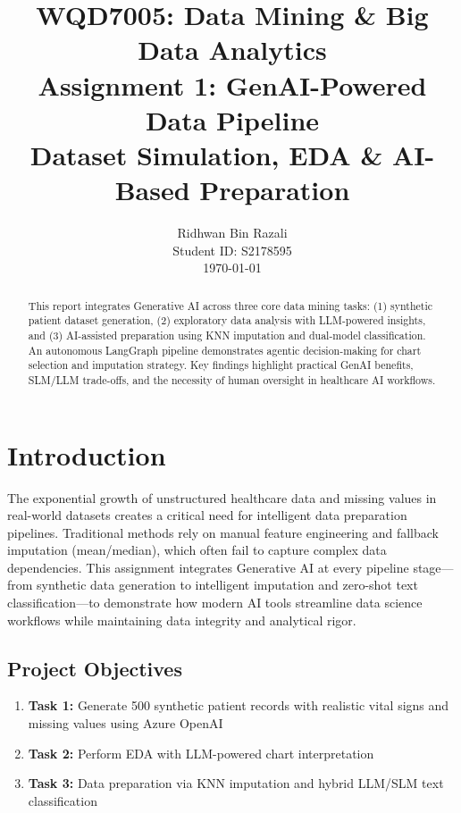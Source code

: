\documentclass[10pt,a4paper]{article}
\title{
    \textbf{WQD7005: Data Mining \& Big Data Analytics}\\
    \vspace{0.5cm}
    \Large Assignment 1: GenAI-Powered Data Pipeline\\
    \normalsize Dataset Simulation, EDA \& AI-Based Preparation
}
\author{
    Ridhwan Bin Razali\\
    Student ID: S2178595\\
    \today
}
\date{}
\begin{document}
\maketitle

\begin{abstract}
This report integrates Generative AI across three core data mining tasks: (1) synthetic patient dataset generation, (2) exploratory data analysis with LLM-powered insights, and (3) AI-assisted preparation using KNN imputation and dual-model classification. An autonomous LangGraph pipeline demonstrates agentic decision-making for chart selection and imputation strategy. Key findings highlight practical GenAI benefits, SLM/LLM trade-offs, and the necessity of human oversight in healthcare AI workflows.
\end{abstract}

\section{Introduction}

The exponential growth of unstructured healthcare data and missing values in real-world datasets creates a critical need for intelligent data preparation pipelines. Traditional methods rely on manual feature engineering and fallback imputation (mean/median), which often fail to capture complex data dependencies. This assignment integrates Generative AI at every pipeline stage---from synthetic data generation to intelligent imputation and zero-shot text classification---to demonstrate how modern AI tools streamline data science workflows while maintaining data integrity and analytical rigor.

\subsection{Project Objectives}
\begin{enumerate}[nosep]
    \item \textbf{Task 1:} Generate 500 synthetic patient records with realistic vital signs and missing values using Azure OpenAI
    \item \textbf{Task 2:} Perform EDA with LLM-powered chart interpretation
    \item \textbf{Task 3:} Data preparation via KNN imputation and hybrid LLM/SLM text classification
\end{enumerate}
\end{document}
